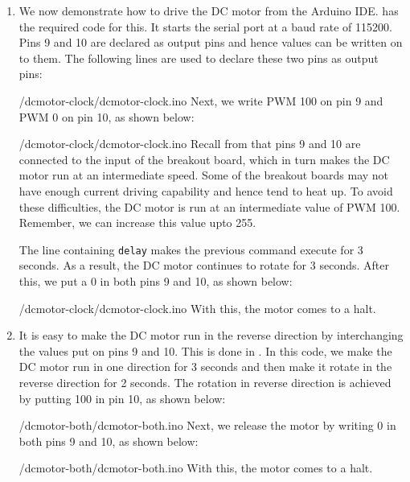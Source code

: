 \begin{enumerate}
  \item We now demonstrate how to drive the DC motor from the Arduino
        IDE.   has the required code for this.  It
        starts the serial port at a baud rate of 115200.  Pins 9 and 10 are
        declared as output pins and hence values can be written on to them. The following 
        lines are used to declare these two pins as output pins: 
        
        {\LocDCMardcode/dcmotor-clock/dcmotor-clock.ino}
        Next, we write PWM 100 on pin 9 and PWM 0 on pin 10, as shown below:
        
        {\LocDCMardcode/dcmotor-clock/dcmotor-clock.ino}
        Recall from  that pins 9 and 10 are connected to the
        input of the breakout board, which in turn makes the DC motor run at
        an intermediate speed.  Some of the breakout boards may not have enough current driving
        capability and hence tend to heat up.  To avoid these difficulties,
        the DC motor is run at an intermediate value of PWM 100. Remember, we can 
        increase this value upto 255. 
        
        The line containing {\tt delay} makes the previous command execute
        for 3 seconds.  As a result, the DC motor continues to rotate for 3
        seconds.  After this, we put a 0 in both pins 9 and 10, as shown below:
        
        {\LocDCMardcode/dcmotor-clock/dcmotor-clock.ino}
        With this, the motor comes to a halt.  
        
  \item It is easy to make the DC motor run in the reverse direction by
        interchanging the values put on pins 9 and 10.  This is done in
        .  In this code, we make the DC motor
        run in one direction for 3 seconds and then make it rotate in the
        reverse direction for 2 seconds.  The rotation in reverse direction
        is achieved by putting 100 in pin 10, as shown below:
        
        {\LocDCMardcode/dcmotor-both/dcmotor-both.ino}
        Next, we release the motor by writing 0 in both pins 9 and 10, as shown below:
        
        {\LocDCMardcode/dcmotor-both/dcmotor-both.ino}
        With this, the motor comes to a halt.  
        

\end{enumerate}
